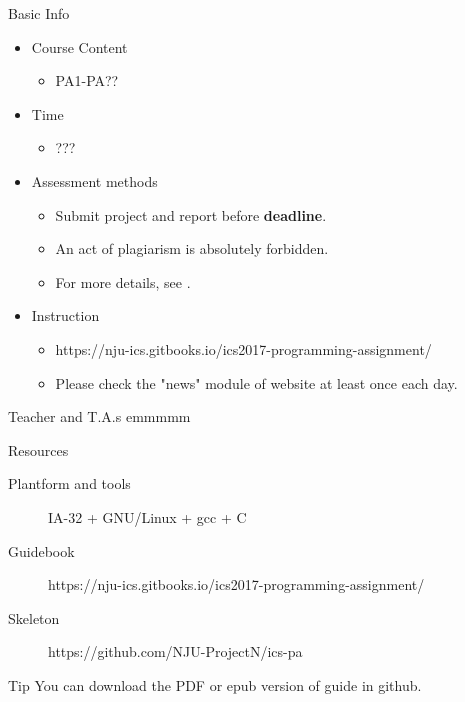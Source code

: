 \documentclass{beamer}
\title{\titletext}
\subtitle{Introduction}
\author{Xie}
\institute{xiemhemail@gmail.com}
\date{Sep ??, 2017}
\begin{document}
	\maketitle
	
\begin{frame}{Basic Info}
	\begin{itemize}
		\item Course Content
		\begin{itemize}
			\item PA1-PA??
		\end{itemize}
		\item Time
		\begin{itemize}
			\item ???
		\end{itemize}
		\item Assessment methods
			\begin{itemize}
				\item Submit project and report before \textbf{deadline}.
				\item An act of plagiarism is absolutely forbidden.
				\item For more details, see \href{https://nju-ics.gitbooks.io/ics2017-programming-assignment/content/submit.html}{}.
			\end{itemize}
		\item \alert{Instruction}
		\begin{itemize}
			\item https://nju-ics.gitbooks.io/ics2017-programming-assignment/
			\item \alert{\huge Please check the "news" module of website at least once each day.}
		\end{itemize}
	\end{itemize}
\end{frame}

\begin{frame}{Teacher and T.A.s}
	emmmmm
\end{frame}

\begin{frame}{Resources}
	\begin{description}
		\item [Plantform and tools] IA-32 + GNU/Linux + gcc + C	
		\item [Guidebook] https://nju-ics.gitbooks.io/ics2017-programming-assignment/
		\item [Skeleton]https://github.com/NJU-ProjectN/ics-pa
	\end{description}
	\begin{alertblock}{Tip}
		You can download the PDF or epub version of guide in github.
	\end{alertblock}
\end{frame}
\end{document}
